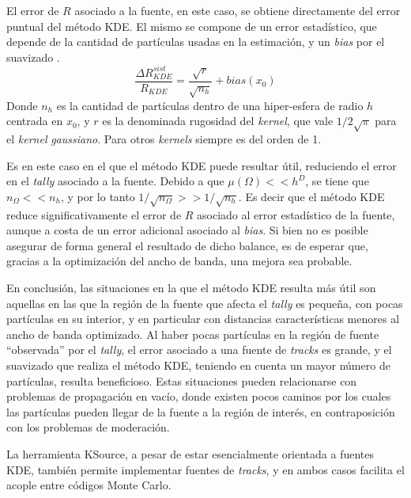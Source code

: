 El error de $R$ asociado a la fuente, en este caso, se obtiene directamente del error puntual del método KDE. El mismo se compone de un error estadístico, que depende de la cantidad de partículas usadas en la estimación, y un \emph{bias} por el suavizado \cite{NP}.
\begin{equation}
    \frac{\Delta R_{KDE}^{sist}}{R_{KDE}} = \frac{\sqrt{r}}{\sqrt{n_h}} + bias(x_0)
\end{equation}
Donde $n_h$ es la cantidad de partículas dentro de una hiper-esfera de radio $h$ centrada en $x_0$, y $r$ es la denominada rugosidad del \emph{kernel}, que vale $1/2\sqrt{\pi}$ para el \emph{kernel} \emph{gaussiano}. Para otros \emph{kernels} siempre es del orden de 1.

Es en este caso en el que el método KDE puede resultar útil, reduciendo el error en el \emph{tally} asociado a la fuente. Debido a que $\mu(\Omega) << h^D$, se tiene que $n_{\Omega} << n_h$, y por lo tanto $1/\sqrt{n_{\Omega}} >> 1/\sqrt{n_h}$. Es decir que el método KDE reduce significativamente el error de $R$ asociado al error estadístico de la fuente, aunque a costa de un error adicional asociado al \emph{bias}. Si bien no es posible asegurar de forma general el resultado de dicho balance, es de esperar que, gracias a la optimización del ancho de banda, una mejora sea probable.

En conclusión, las situaciones en la que el método KDE resulta más útil son aquellas en las que la región de la fuente que afecta el \emph{tally} es pequeña, con pocas partículas en su interior, y en particular con distancias características menores al ancho de banda optimizado. Al haber pocas partículas en la región de fuente ``observada'' por el \emph{tally}, el error asociado a una fuente de \emph{tracks} es grande, y el suavizado que realiza el método KDE, teniendo en cuenta un mayor número de partículas, resulta beneficioso. Estas situaciones pueden relacionarse con problemas de propagación en vacío, donde existen pocos caminos por los cuales las partículas pueden llegar de la fuente a la región de interés, en contraposición con los problemas de moderación.

La herramienta KSource, a pesar de estar esencialmente orientada a fuentes KDE, también permite implementar fuentes de \emph{tracks}, y en ambos casos facilita el acople entre códigos Monte Carlo.
